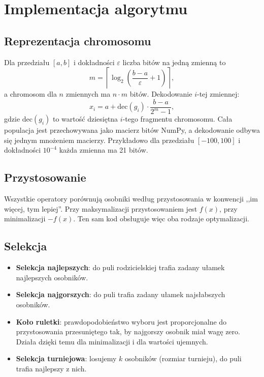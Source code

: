 \documentclass[11pt,a4paper]{article}
\begin{document}
\section{Implementacja algorytmu}

\subsection{Reprezentacja chromosomu}

Dla przedziału $[a, b]$ i dokładności $\varepsilon$ liczba bitów na jedną zmienną to
\[
  m = \left\lceil \log_2\!\left(\frac{b-a}{\varepsilon} + 1\right) \right\rceil ,
\]
a chromosom dla $n$ zmiennych ma $n \cdot m$ bitów. Dekodowanie $i$-tej zmiennej:
\[
  x_i = a + \mathrm{dec}(g_i)\cdot\frac{b-a}{2^m-1},
\]
gdzie $\mathrm{dec}(g_i)$ to wartość dziesiętna $i$-tego fragmentu chromosomu. Cała populacja
jest przechowywana jako macierz bitów NumPy, a dekodowanie odbywa się jednym mnożeniem macierzy.
Przykładowo dla przedziału $[-100, 100]$ i dokładności $10^{-4}$ każda zmienna ma 21 bitów.

\subsection{Przystosowanie}

Wszystkie operatory porównują osobniki według przystosowania w konwencji ,,im więcej, tym lepiej''.
Przy maksymalizacji przystosowaniem jest $f(x)$, przy minimalizacji $-f(x)$. Ten sam kod obsługuje
więc oba rodzaje optymalizacji.

\subsection{Selekcja}
\begin{itemize}
  \item \textbf{Selekcja najlepszych}: do puli rodzicielskiej trafia zadany ułamek najlepszych osobników.
  \item \textbf{Selekcja najgorszych}: do puli trafia zadany ułamek najsłabszych osobników.
  \item \textbf{Koło ruletki}: prawdopodobieństwo wyboru jest proporcjonalne do przystosowania
        przesuniętego tak, by najgorszy osobnik miał wagę zero. Działa dzięki temu dla
        minimalizacji i dla wartości ujemnych.
  \item \textbf{Selekcja turniejowa}: losujemy $k$ osobników (rozmiar turnieju), do puli trafia najlepszy z nich.
\end{itemize}
\end{document}
